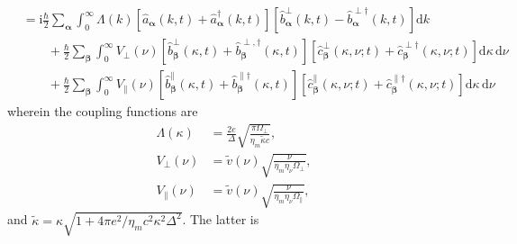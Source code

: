 \documentclass{article}
\begin{document}
\begin{equation}
\begin{split}
&= \mathrm{i}\frac{\hbar}{2}\sum_{\bm{\alpha}}\int_0^\infty\Lambda(k)\left[\hat{a}_{\bm{\alpha}}(k,t) + \hat{a}_{\bm{\alpha}}^\dagger(k,t)\right]\left[\hat{b}_{\bm{\alpha}}^\perp(k,t) - \hat{b}_{\bm{\alpha}}^{\perp\dagger}(k,t)\right]\mathrm{d}k\\
&\qquad + \frac{\hbar}{2}\sum_{\bm{\beta}}\int_0^\infty V_\perp(\nu)\left[\hat{b}_{\bm{\beta}}^\perp(\kappa,t) + \hat{b}_{\bm{\beta}}^{\perp,\dagger}(\kappa,t)\right]\left[\hat{c}_{\bm{\beta}}^\perp(\kappa,\nu;t) + \hat{c}_{\bm{\beta}}^{\perp\dagger}(\kappa,\nu;t)\right]\mathrm{d}\kappa\,\mathrm{d}\nu\\
&\qquad + \frac{\hbar}{2}\sum_{\bm{\beta}}\int_0^\infty V_\parallel(\nu)\left[\hat{b}_{\bm{\beta}}^\parallel(\kappa,t) + \hat{b}_{\bm{\beta}}^{\parallel\dagger}(\kappa,t)\right]\left[\hat{c}_{\bm{\beta}}^\parallel(\kappa,\nu;t) + \hat{c}_{\bm{\beta}}^{\parallel\dagger}(\kappa,\nu;t)\right]\mathrm{d}\kappa\,\mathrm{d}\nu
\end{split}
\end{equation}
wherein the coupling functions are
\begin{equation}\label{eq:couplingFunctions}
\begin{split}
\Lambda(\kappa) &= \frac{2e}{\Delta}\sqrt{\frac{\pi\Omega_\perp}{\eta_m\tilde{\kappa}c}},\\
V_\perp(\nu) &= \tilde{v}(\nu)\sqrt{\frac{\nu}{\eta_m\eta_\nu\Omega_\perp}},\\
V_\parallel(\nu) &= \tilde{v}(\nu)\sqrt{\frac{\nu}{\eta_m\eta_\nu\Omega_\parallel}},
\end{split}
\end{equation}
and $\tilde{\kappa} = \kappa\sqrt{1 + 4\pi e^2/\eta_mc^2\kappa^2\Delta^2}$. The latter is 
\end{document}
